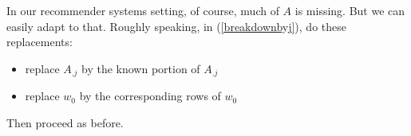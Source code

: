 In our recommender systems setting, of course, much of $A$ is missing.
But we can easily adapt to that.  Roughly speaking, in
(\ref{breakdownbyj}), do these replacements:

\begin{itemize}

\item replace $A_{.j}$ by the known portion of $A_{.j}$

\item replace $w_0$ by the corresponding rows of $w_0$

\end{itemize} 

Then proceed as before.  

% 
% 
% 
% 
% 
% 
% 
% 
% 


